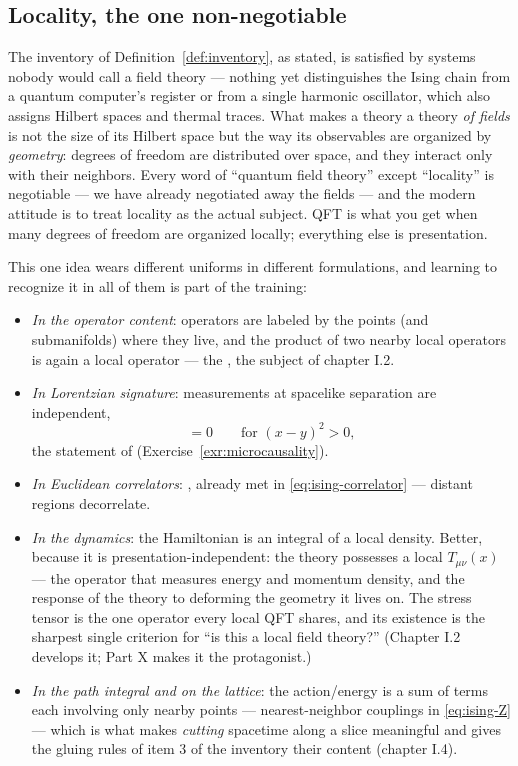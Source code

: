 \subsection{Locality, the one non-negotiable}
\label{sec:locality}

The inventory of Definition~\ref{def:inventory}, as stated, is satisfied by
systems nobody would call a field theory --- nothing yet distinguishes the Ising
chain from a quantum computer's register or from a single harmonic oscillator,
which also assigns Hilbert spaces and thermal traces. What makes a theory a
theory \emph{of fields} is not the size of its Hilbert space but the way its
observables are organized by \emph{geometry}: degrees of freedom are distributed
over space, and they interact only with their neighbors. Every word of ``quantum
field theory'' except ``locality'' is negotiable --- we have already negotiated
away the fields --- and the modern attitude is to treat locality as the actual
subject. QFT is what you get when many degrees of freedom are organized locally;
everything else is presentation.

This one idea wears different uniforms in different formulations, and learning
to recognize it in all of them is part of the training:

\begin{itemize}
\item \emph{In the operator content}: operators are labeled by the points (and
submanifolds) where they live, and the product of two nearby local operators is
again a local operator --- the , the subject of
chapter I.2.
\item \emph{In Lorentzian signature}: measurements at spacelike separation are
independent,
\begin{equation*}
[\op_1(x), \op_2(y)] = 0 \qquad \text{for } (x-y)^2 > 0,
\end{equation*}
the statement of  (Exercise~\ref{exr:microcausality}).
\item \emph{In Euclidean correlators}: , already
met in \eqref{eq:ising-correlator} --- distant regions decorrelate.
\item \emph{In the dynamics}: the Hamiltonian is an integral of a local density.
Better, because it is presentation-independent: the theory possesses a local
 $T_{\mu\nu}(x)$ --- the operator that measures energy and
momentum density, and the response of the theory to deforming the geometry it
lives on. The stress tensor is the one operator every local QFT shares, and its
existence is the sharpest single criterion for ``is this a local field theory?''
(Chapter I.2 develops it; Part X makes it the protagonist.)
\item \emph{In the path integral and on the lattice}: the action/energy is a sum
of terms each involving only nearby points --- nearest-neighbor couplings in
\eqref{eq:ising-Z} --- which is what makes \emph{cutting} spacetime along a slice
meaningful and gives the gluing rules of item 3 of the inventory their content
(chapter I.4).
\end{itemize}

